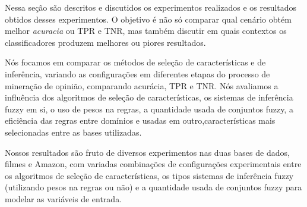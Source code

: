\documentclass[template.tex]{subfiles}
\begin{document}

Nessa seção são descritos e discutidos os experimentos realizados e os resultados obtidos desses experimentos. O objetivo é não só comparar qual cenário obtém melhor \textit{acuracia} ou TPR e TNR, mas também discutir em quais contextos os classificadores produzem melhores ou piores resultados.


Nós focamos em comparar os métodos de seleção de características e de inferência, variando as configurações em diferentes etapas do processo de mineração de opinião, comparando acurácia, TPR e TNR. Nós avaliamos a influência dos algoritmos de seleção de características, os sistemas de inferência fuzzy em si, o uso de pesos na regras, a quantidade usada de conjuntos fuzzy, a eficiência das regras entre domínios e usadas em outro,características mais selecionadas entre as bases utilizadas. 




Nossos resultados são fruto de diversos experimentos nas duas bases de dados, filmes e Amazon, com variadas combinações de configurações experimentais entre os algoritmos de seleção de características, os tipos sistemas de inferência fuzzy (utilizando pesos na regras ou não) e a quantidade usada de conjuntos fuzzy para modelar as variáveis de entrada. 
\end{document}
